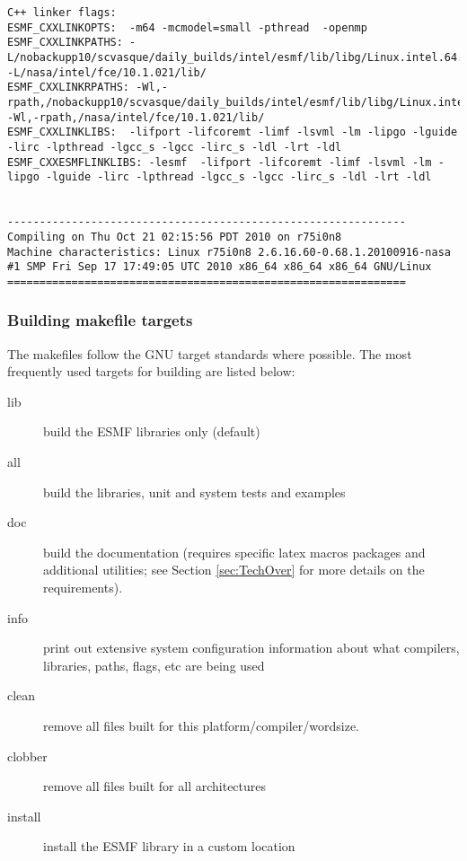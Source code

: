 \begin{verbatim}
C++ linker flags:
ESMF_CXXLINKOPTS:  -m64 -mcmodel=small -pthread  -openmp
ESMF_CXXLINKPATHS: -L/nobackupp10/scvasque/daily_builds/intel/esmf/lib/libg/Linux.intel.64.mpiuni.default  -L/nasa/intel/fce/10.1.021/lib/
ESMF_CXXLINKRPATHS: -Wl,-rpath,/nobackupp10/scvasque/daily_builds/intel/esmf/lib/libg/Linux.intel.64.mpiuni.default -Wl,-rpath,/nasa/intel/fce/10.1.021/lib/
ESMF_CXXLINKLIBS:  -lifport -lifcoremt -limf -lsvml -lm -lipgo -lguide -lirc -lpthread -lgcc_s -lgcc -lirc_s -ldl -lrt -ldl
ESMF_CXXESMFLINKLIBS: -lesmf  -lifport -lifcoremt -limf -lsvml -lm -lipgo -lguide -lirc -lpthread -lgcc_s -lgcc -lirc_s -ldl -lrt -ldl


--------------------------------------------------------------
Compiling on Thu Oct 21 02:15:56 PDT 2010 on r75i0n8
Machine characteristics: Linux r75i0n8 2.6.16.60-0.68.1.20100916-nasa #1 SMP Fri Sep 17 17:49:05 UTC 2010 x86_64 x86_64 x86_64 GNU/Linux
==============================================================

\end{verbatim}


\subsubsection{Building makefile targets}

The makefiles follow the GNU target standards where possible.
The most frequently used targets for building are listed below:
\begin{description}
\item[lib] build the ESMF libraries only (default)
\item[all] build the libraries, unit and system tests and examples
\item[doc] build the documentation (requires specific latex macros packages
and additional utilities; see Section \ref{sec:TechOver} for more details
on the requirements).  
\item[info] print out extensive system configuration information about what
           compilers, libraries, paths, flags, etc are being used
\item[clean] remove all files built for this platform/compiler/wordsize.
\item[clobber] remove all files built for all architectures
\item[install] install the ESMF library in a custom location
\end{description}


